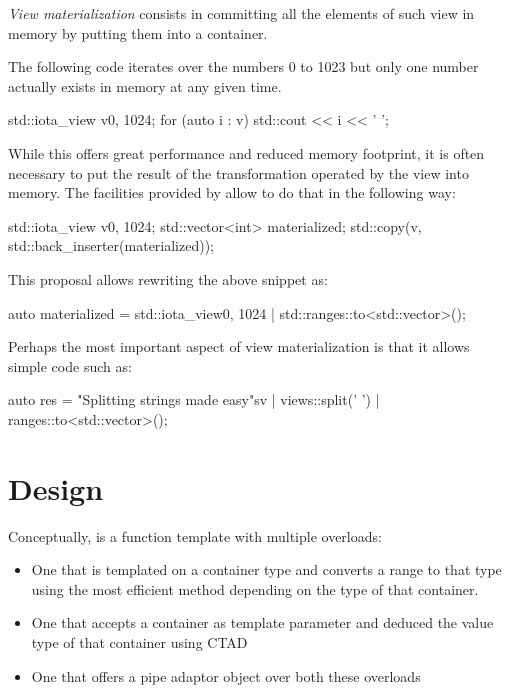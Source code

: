 \documentclass{wg21}
\begin{document}
\emph{View materialization} consists in committing all the elements of such view in memory by putting them into a container.

The following code iterates over the numbers 0 to 1023 but only one number actually exists in memory at any given time.
\begin{colorblock}
std::iota_view v{0, 1024};
for (auto i : v) {
    std::cout << i << ' ';
}
\end{colorblock}

While this offers great performance and reduced memory footprint, it is often necessary to put the result of the transformation operated by the view into memory.
The facilities provided by \cite{P0896R3} allow to do that in the following way:


\begin{colorblock}
    std::iota_view v{0, 1024};
    std::vector<int> materialized;
    std::copy(v, std::back_inserter(materialized));
\end{colorblock}

This proposal allows rewriting the above snippet as:

\begin{colorblock}
    auto materialized = std::iota_view{0, 1024} | std::ranges::to<std::vector>();
\end{colorblock}


Perhaps the most important aspect of view materialization is that it allows simple code such as:

\begin{colorblock}
auto res = "Splitting strings made easy"sv
    | views::split(' ')
    | ranges::to<std::vector>();
\end{colorblock}

\section{Design}

Conceptually,  is a function template with multiple overloads:
\begin{itemize}
    \item One that is templated on a container type and converts a range to that type using the most efficient method depending on the type of that container.
    \item One that accepts a container as template parameter and deduced the value type of that container using CTAD
    \item One that offers a pipe adaptor object over both these overloads
\end{itemize}
\end{document}
